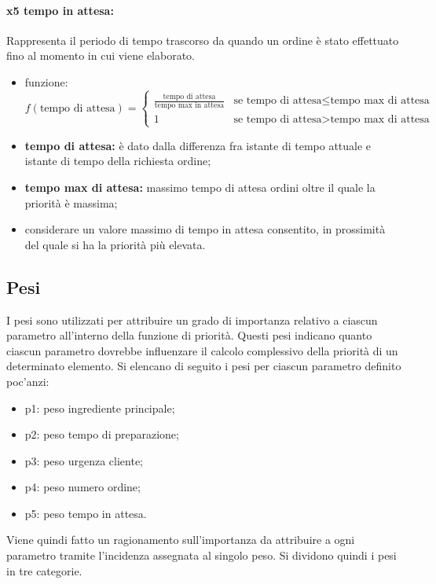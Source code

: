 \paragraph{x5 tempo in attesa:}
Rappresenta il periodo di tempo trascorso da quando un ordine è stato effettuato fino al momento in cui viene elaborato.
\begin{itemize}
	\item funzione: \[ f(\text{tempo di attesa}) = \begin{cases} \frac{\text{tempo di attesa}}{\text{tempo max in attesa}} & \text{se } \text{tempo di attesa} \leq \text{tempo max di attesa} \\ 1 & \text{se } \text{tempo di attesa} > \text{tempo max di attesa} \end{cases} \]

	\item \textbf{tempo di attesa:} è dato dalla differenza fra istante di tempo attuale e istante di tempo della richiesta ordine;
	\item \textbf{tempo max di attesa:} massimo tempo di attesa ordini oltre il quale la priorità è massima;
	\item considerare un valore massimo di tempo in attesa consentito, in prossimità del quale si ha la priorità più elevata.
\end{itemize}

\subsection{Pesi}
I pesi sono utilizzati per attribuire un grado di importanza relativo a ciascun parametro all'interno della funzione di priorità. Questi pesi indicano quanto ciascun parametro dovrebbe influenzare il calcolo complessivo della priorità di un determinato elemento.
Si elencano di seguito i pesi per ciascun parametro definito poc’anzi:
\begin{itemize}
	\item p1: peso ingrediente principale;
	\item p2: peso tempo di preparazione;
	\item p3: peso urgenza cliente;
	\item p4: peso numero ordine;
	\item p5: peso tempo in attesa.
\end{itemize}

Viene quindi fatto un ragionamento sull’importanza da attribuire a ogni parametro tramite l’incidenza assegnata al singolo peso. Si dividono quindi i pesi in tre categorie.

